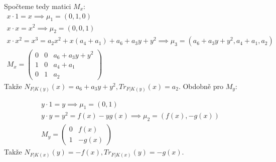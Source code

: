 \documentclass[12pt, a4paper]{article}
\begin{document}
Spočteme tedy matici $M_x$:
\begin{gather*}
x\cdot 1 = x \implies \mu_1 = (0, 1, 0)\\
x\cdot x = x^2 \implies \mu_2 = (0, 0, 1)\\
x\cdot x^2 = x^3 = a_2x^2+x(a_4+a_1) + a_6 + a_3y + y^2 \implies \mu_3 = (a_6 + a_3y + y^2, a_4+a_1, a_2)\\
M_x = \begin{pmatrix}
0 & 0 & a_6 + a_3y + y^2\\
1 & 0 & a_4+a_1\\
0 & 1 & a_2
\end{pmatrix}
\end{gather*}
Takže $N_{F|K(y)}(x) = a_6 + a_3y + y^2, Tr_{F|K(y)}(x)=a_2$. Obdobně pro $M_y$:

\begin{gather*}
y\cdot 1 = y \implies \mu_1 = (0, 1)\\
y\cdot y = y^2 = f(x)-yg(x) \implies \mu_2 = (f(x),-g(x))\\
M_y = \begin{pmatrix}
0 & f(x)\\
1 & -g(x)
\end{pmatrix}
\end{gather*}
Takže $N_{F|K(x)}(y) = -f(x), Tr_{F|K(x)}(y)=-g(x)$.
\end{document}
